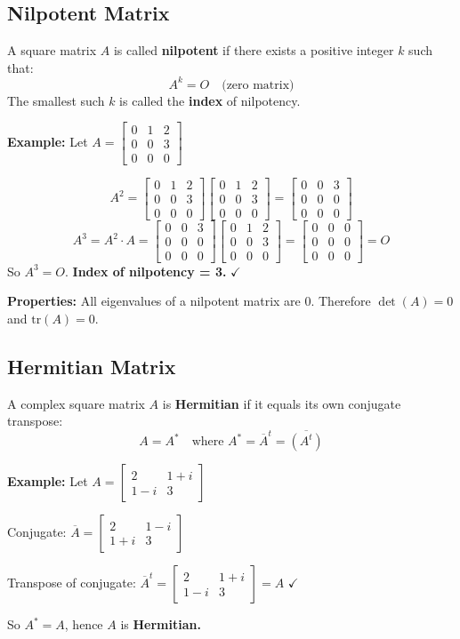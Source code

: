 \documentclass[12pt]{article}
\newcommand{\mat}[1]{\begin{bmatrix}#1\end{bmatrix}}
\begin{document}
\subsection{Nilpotent Matrix}

\begin{defbox}
A square matrix $A$ is called \textbf{nilpotent} if there exists a positive integer $k$ such that:
\[
  A^k = O \quad \text{(zero matrix)}
\]
The smallest such $k$ is called the \textbf{index} of nilpotency.
\end{defbox}

\begin{proofbox}
\textbf{Example:} Let $A = \mat{0&1&2\\0&0&3\\0&0&0}$

\[
  A^2 = \mat{0&1&2\\0&0&3\\0&0&0}\mat{0&1&2\\0&0&3\\0&0&0}
       = \mat{0&0&3\\0&0&0\\0&0&0}
\]
\[
  A^3 = A^2 \cdot A = \mat{0&0&3\\0&0&0\\0&0&0}\mat{0&1&2\\0&0&3\\0&0&0}
       = \mat{0&0&0\\0&0&0\\0&0&0} = O
\]
So $A^3 = O$. \textbf{Index of nilpotency = 3.} $\checkmark$
\end{proofbox}

\begin{keybox}
\textbf{Properties:} All eigenvalues of a nilpotent matrix are 0. Therefore $\det(A) = 0$ and $\text{tr}(A) = 0$.
\end{keybox}

\subsection{Hermitian Matrix}

\begin{defbox}
A complex square matrix $A$ is \textbf{Hermitian} if it equals its own conjugate transpose:
\[
  A = A^* \quad \text{where } A^* = \overline{A}^t = \overline{(A^t)}
\]
\end{defbox}

\begin{proofbox}
\textbf{Example:} Let $A = \mat{2 & 1+i \\ 1-i & 3}$

Conjugate: $\overline{A} = \mat{2 & 1-i \\ 1+i & 3}$

Transpose of conjugate: $\overline{A}^t = \mat{2 & 1+i \\ 1-i & 3} = A$ \quad $\checkmark$

So $A^* = A$, hence $A$ is \textbf{Hermitian.}
\end{proofbox}
\end{document}
